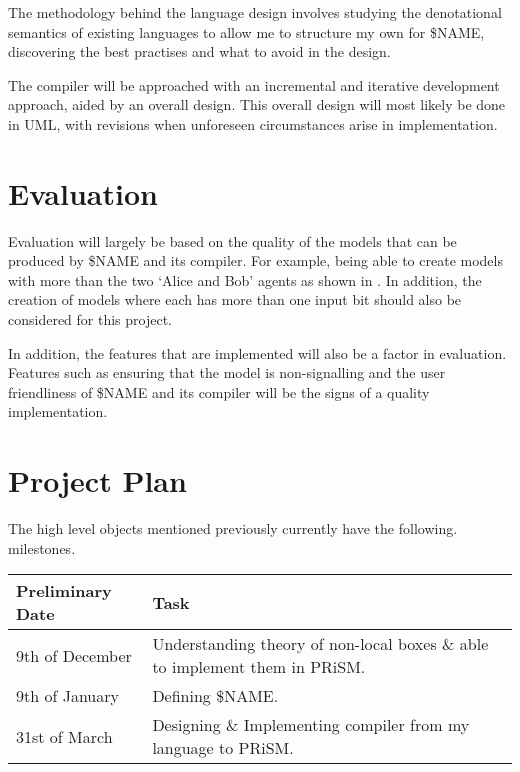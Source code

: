 \documentclass[11pt, a4paper]{article}
\begin{document}
The methodology behind the language design involves studying the denotational
semantics of existing languages to allow me to structure my own for \$NAME,
discovering the best practises and what to avoid in the design.

The compiler will be approached with an incremental and iterative development
approach, aided by an overall design. This overall design will most likely be
done in UML, with revisions when unforeseen circumstances arise in
implementation.


\section{Evaluation} %
\label{sec:evaluation}

Evaluation will largely be based on the quality of the models that can be
produced by \$NAME and its compiler. For example, being able to create models
with more than the two `Alice and Bob' agents as shown in 
\cite[Definition~1]{nlb_lamontague}. In addition, the creation of models where
each has more than one input bit should also be considered for this project.

In addition, the features that are implemented will also be a factor in
evaluation. Features such as ensuring that the model is non-signalling and
the user friendliness of \$NAME and its compiler will be the signs of a quality 
implementation.


\section{Project Plan} %
\label{sec:project_plan}
The high level objects mentioned previously currently have the following.
milestones.

\begin{center}
    \begin{tabular}{l | p{7.5cm}}
        Preliminary Date & Task \\
        \hline
        9th of December & Understanding theory of non-local boxes \& able to
        implement them in PRiSM. \\

        9th of January & Defining \$NAME. \\

        31st of March & Designing \& Implementing compiler from my language to
        PRiSM. \\
\end{tabular}
\end{center}
\end{document}
